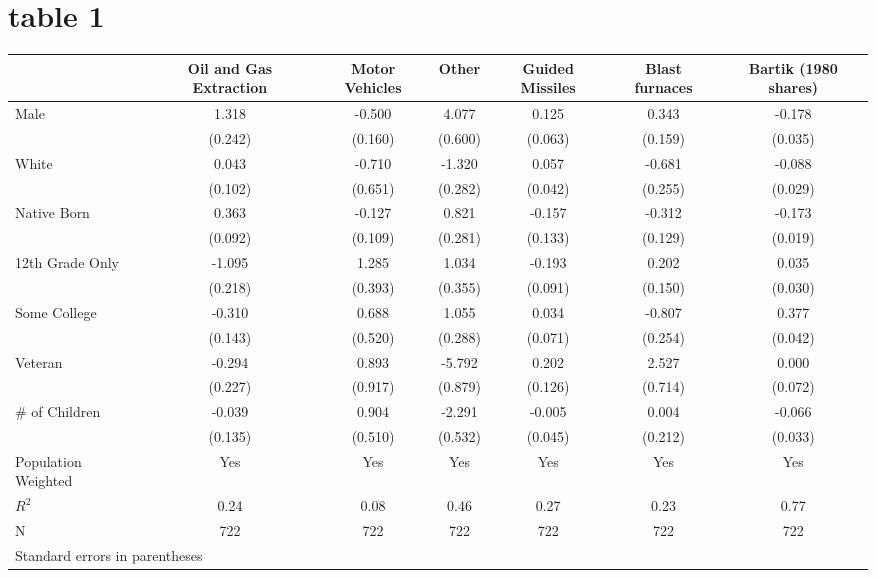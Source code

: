 \documentclass{article}
\begin{document}
\section{table 1}
\begin{tabular}{l*{6}{c}}
\toprule
                &\multicolumn{1}{c}{Oil and Gas Extraction}&\multicolumn{1}{c}{Motor Vehicles}&\multicolumn{1}{c}{Other}&\multicolumn{1}{c}{Guided Missiles}&\multicolumn{1}{c}{Blast furnaces}&\multicolumn{1}{c}{Bartik (1980 shares)}\\
\midrule
Male            &    1.318&   -0.500&    4.077&    0.125&    0.343&   -0.178\\
                &  (0.242)&  (0.160)&  (0.600)&  (0.063)&  (0.159)&  (0.035)\\
White           &    0.043&   -0.710&   -1.320&    0.057&   -0.681&   -0.088\\
                &  (0.102)&  (0.651)&  (0.282)&  (0.042)&  (0.255)&  (0.029)\\
Native Born     &    0.363&   -0.127&    0.821&   -0.157&   -0.312&   -0.173\\
                &  (0.092)&  (0.109)&  (0.281)&  (0.133)&  (0.129)&  (0.019)\\
12th Grade Only &   -1.095&    1.285&    1.034&   -0.193&    0.202&    0.035\\
                &  (0.218)&  (0.393)&  (0.355)&  (0.091)&  (0.150)&  (0.030)\\
Some College    &   -0.310&    0.688&    1.055&    0.034&   -0.807&    0.377\\
                &  (0.143)&  (0.520)&  (0.288)&  (0.071)&  (0.254)&  (0.042)\\
Veteran         &   -0.294&    0.893&   -5.792&    0.202&    2.527&    0.000\\
                &  (0.227)&  (0.917)&  (0.879)&  (0.126)&  (0.714)&  (0.072)\\
\# of Children  &   -0.039&    0.904&   -2.291&   -0.005&    0.004&   -0.066\\
                &  (0.135)&  (0.510)&  (0.532)&  (0.045)&  (0.212)&  (0.033)\\
\midrule
Population Weighted&      Yes&      Yes&      Yes&      Yes&      Yes&      Yes\\
$ R^2$          &     0.24&     0.08&     0.46&     0.27&     0.23&     0.77\\
N               &      722&      722&      722&      722&      722&      722\\
\bottomrule
\multicolumn{7}{l}{\footnotesize Standard errors in parentheses}\\
\end{tabular}
\end{document}
